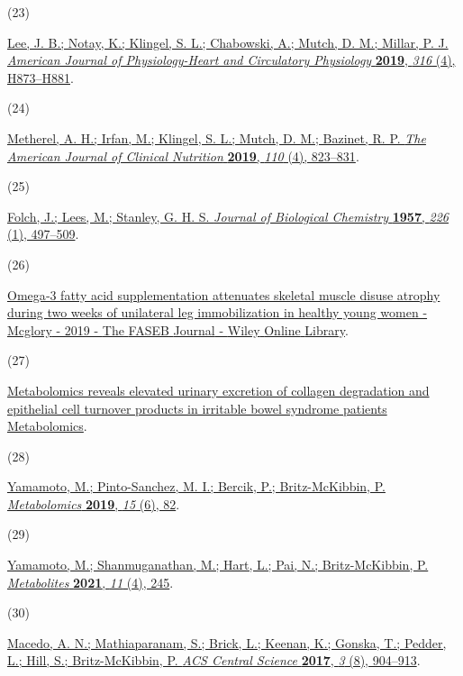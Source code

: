 \documentclass[journal=jacsat,manuscript=article]{achemso}
\newlength{\cslhangindent}
\newlength{\csllabelwidth}
\newenvironment{CSLReferences}[2] %
 {\begin{list}{}{%
  \setlength{\itemindent}{0pt}
  \setlength{\leftmargin}{0pt}
  \setlength{\parsep}{0pt}
  \ifodd #1
   \setlength{\leftmargin}{\cslhangindent}
   \setlength{\itemindent}{-1\cslhangindent}
  \fi
  \setlength{\itemsep}{#2\baselineskip}}}
 {\end{list}}
\newcommand{\CSLLeftMargin}[1]{\parbox[t]{\csllabelwidth}{#1}}
\newcommand{\CSLRightInline}[1]{\parbox[t]{\linewidth - \csllabelwidth}{#1}\break}
\begin{document}
\begin{CSLReferences}{0}{0}
\CSLLeftMargin{(23) }%
\CSLRightInline{\href{https://doi.org/10.1152/ajpheart.00677.2018}{Lee,
J. B.; Notay, K.; Klingel, S. L.; Chabowski, A.; Mutch, D. M.; Millar,
P. J. \emph{American Journal of Physiology-Heart and Circulatory
Physiology} \textbf{2019}, \emph{316} (4), H873--H881}.}

\CSLLeftMargin{(24) }%
\CSLRightInline{\href{https://doi.org/10.1093/ajcn/nqz097}{Metherel, A.
H.; Irfan, M.; Klingel, S. L.; Mutch, D. M.; Bazinet, R. P. \emph{The
American Journal of Clinical Nutrition} \textbf{2019}, \emph{110} (4),
823--831}.}

\CSLLeftMargin{(25) }%
\CSLRightInline{\href{https://doi.org/10.1016/S0021-9258(18)64849-5}{Folch,
J.; Lees, M.; Stanley, G. H. S. \emph{Journal of Biological Chemistry}
\textbf{1957}, \emph{226} (1), 497--509}.}

\CSLLeftMargin{(26) }%
\CSLRightInline{\href{https://faseb.onlinelibrary.wiley.com/doi/full/10.1096/fj.201801857RRR}{Omega‐3
fatty acid supplementation attenuates skeletal muscle disuse atrophy
during two weeks of unilateral leg immobilization in healthy young women
- {Mcglory} - 2019 - {The} {FASEB} {Journal} - {Wiley} {Online}
{Library}}.}

\CSLLeftMargin{(27) }%
\CSLRightInline{\href{https://link.springer.com/article/10.1007/s11306-019-1543-0}{Metabolomics
reveals elevated urinary excretion of collagen degradation and
epithelial cell turnover products in irritable bowel syndrome patients
{\textbar} {Metabolomics}}.}

\CSLLeftMargin{(28) }%
\CSLRightInline{\href{https://doi.org/10.1007/s11306-019-1543-0}{Yamamoto,
M.; Pinto-Sanchez, M. I.; Bercik, P.; Britz-McKibbin, P.
\emph{Metabolomics} \textbf{2019}, \emph{15} (6), 82}.}

\CSLLeftMargin{(29) }%
\CSLRightInline{\href{https://doi.org/10.3390/metabo11040245}{Yamamoto,
M.; Shanmuganathan, M.; Hart, L.; Pai, N.; Britz-McKibbin, P.
\emph{Metabolites} \textbf{2021}, \emph{11} (4), 245}.}

\CSLLeftMargin{(30) }%
\CSLRightInline{\href{https://doi.org/10.1021/acscentsci.7b00299}{Macedo,
A. N.; Mathiaparanam, S.; Brick, L.; Keenan, K.; Gonska, T.; Pedder, L.;
Hill, S.; Britz-McKibbin, P. \emph{ACS Central Science} \textbf{2017},
\emph{3} (8), 904--913}.}


\end{CSLReferences}
\end{document}
